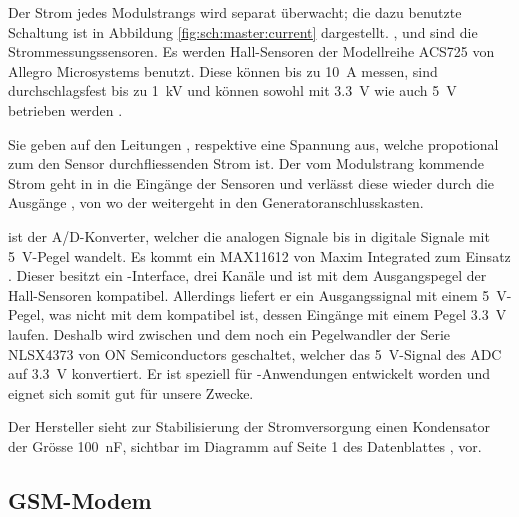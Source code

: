 Der  Strom jedes  Modulstrangs  wird separat  \"uberwacht;  die dazu  benutzte
Schaltung   ist   in   Abbildung   \ref{fig:sch:master:current}   dargestellt.
,    und    sind  die  Strommessungssensoren. Es
werden  Hall-Sensoren   der  Modellreihe   ACS725  von   Allegro  Microsystems
benutzt. Diese k\"onnen bis zu  \SI{10}{\ampere} messen, sind durchschlagsfest
bis zu  \SI{1}{\kilo\volt} und  k\"onnen sowohl  mit \SI{3.3}{\volt}  wie auch
\SI{5}{\volt} betrieben werden \cite{datasheet:hallic}.

Sie  geben   auf  den  Leitungen  ,     respektive
  eine   Spannung  aus,   welche  propotional  zum   den  Sensor
durchfliessenden Strom ist. Der vom Modulstrang  kommende Strom geht in in die
Eing\"ange  der Sensoren und verl\"asst diese wieder
durch die Ausg\"ange , von wo der weitergeht in den
Generatoranschlusskasten.

   ist    der   A/D-Konverter,   welcher   die    analogen   Signale
 bis  in  digitale Signale mit \SI{5}{\volt}-Pegel
wandelt. Es   kommt   ein   MAX11612   von  Maxim   Integrated   zum   Einsatz
\cite{datasheet:adc}. Dieser besitzt ein \ISC-Interface, drei Kan\"ale und ist
mit  dem  Ausgangspegel  der  Hall-Sensoren  kompatibel.   Allerdings  liefert
er  ein  Ausgangssignal  mit  einem \SI{5}{\volt}-Pegel,  was  nicht  mit  dem
\Raspi  kompatibel  ist, dessen  Eing\"ange  mit  einem Pegel  \SI{3.3}{\volt}
laufen. Deshalb wird zwischen  und  dem \Raspi noch ein Pegelwandler
der   Serie   NLSX4373  von   ON   Semiconductors   geschaltet,  welcher   das
\SI{5}{\volt}-Signal des ADC auf  \SI{3.3}{\volt} konvertiert. Er ist speziell
f\"ur  \ISC-Anwendungen entwickelt  worden  und eignet  sich  somit gut  f\"ur
unsere Zwecke.

Der Hersteller sieht zur  Stabilisierung der Stromversorgung einen Kondensator
der  Gr\"osse \SI{100}{\nano\farad},  sichtbar  im Diagramm  auf  Seite 1  des
Datenblattes \cite{datasheet:hallic}, vor.

\clearpage
\subsection{GSM-Modem}
\label{subsec:hw:master:gsm}

